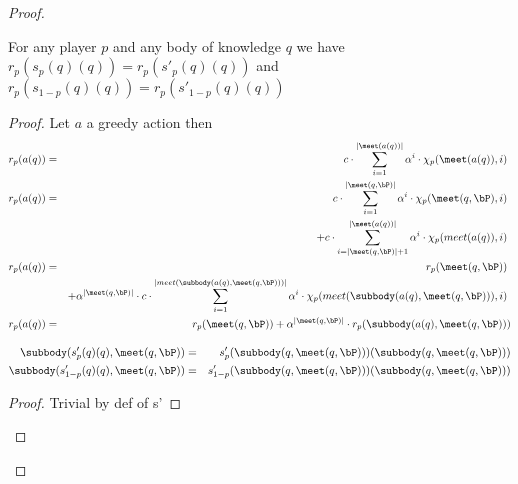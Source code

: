 \begin{proof} 
	
\begin{mylem}
	\label{lemrew}
	For any player $p$ and any body of knowledge $q$ we have $r_p(s_p(q)(q)) =r_p(s'_p(q)(q))$ and $r_p(s_{1-p}(q)(q)) =r_p(s'_{1-p}(q)(q))$
\end{mylem}
\begin{proof}
	\iffalse	By induction :
	
	As for any $p$, $s_p(q_0) = s'_p(q_0)$ we have $r_p(s_p(q_0)(q_0)) =r_p(s'_p(q_0)(q_0))$ and $r_p(s_{1-p}(q_0)(q_0)) =r_p(s'_{1-p}(q_0)(q_0))$.
	
	Suppose that there exists $n$ such that for any $q$ with $|q| \leq n$ then $r_p(s_p(q)(q)) =r_p(s'_p(q)(q))$ and $r_p(s_{1-p}(q)(q)) =r_p(s'_{1-p}(q)(q))$
	\fi
	
	Let $a$ a greedy action then
	\begin{eqnarray*}
		r_p(a(q)) &= & {\displaystyle c \cdot \sum_{i=1}^{|\meet(a(q))|} \alpha^i \cdot \chi_p(\meet(a(q)),i)} \ \\
		r_p(a(q)) &= & {\displaystyle c \cdot \sum_{i=1}^{|\meet(q,\bP)|} \alpha^i \cdot \chi_p(\meet(q,\bP),i)} \ \\
		&&+ {\displaystyle c \cdot \sum_{i=|\meet(q,\bP)|+1}^{|\meet(a(q))|} \alpha^i \cdot \chi_p(meet(a(q)),i)} \ \\
		r_p(a(q)) &= & r_p(\meet(q,\bP)) \ \\
		&&+ \alpha^{|\meet(q,\bP)|} \cdot {\displaystyle c \cdot \sum_{i=1}^{|meet(\subbody(a(q),\meet(q,\bP)))|} \alpha^i \cdot \chi_p(meet(\subbody(a(q),\meet(q,\bP))),i)} \ \\
		r_p(a(q)) &= & r_p(\meet(q,\bP)) + \alpha^{|\meet(q,\bP)|} \cdot r_p(\subbody(a(q),\meet(q,\bP))) \\
	\end{eqnarray*}

	\begin{mylem}
		\begin{eqnarray*}
		\subbody(s'_p(q)(q),\meet(q,\bP)) & = & s'_p(\subbody(q,\meet(q,\bP)))(\subbody(q,\meet(q,\bP))) \\
		\subbody(s'_{1-p}(q)(q),\meet(q,\bP)) & = & s'_{1-p}(\subbody(q,\meet(q,\bP)))(\subbody(q,\meet(q,\bP))) \\
		\end{eqnarray*}
	\end{mylem}
\begin{proof}
	Trivial by def of s'
\end{proof}


\end{proof}
\end{proof}
